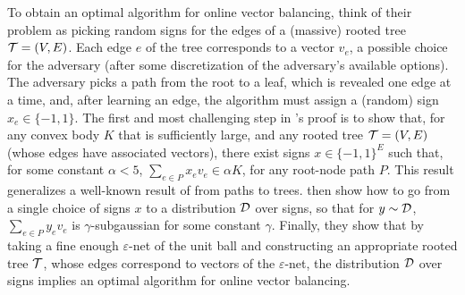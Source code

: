 

To obtain an optimal algorithm for online vector balancing, \citet{kulkarni2024optimal} think of their problem as picking random signs for the edges of a (massive) rooted tree $\mathcal{T} = (V,E)$. Each edge $e$ of the tree corresponds to a vector $v_e$, a possible choice for the adversary (after some discretization of the adversary's available options). The adversary picks a path from the root to a leaf, which is revealed one edge at a time, and, after learning an edge, the algorithm must assign a (random) sign $x_e \in \{-1,1 \}$. The first and most challenging step in \citeauthor{kulkarni2024optimal}'s proof is to show that, for any convex body $K$ that is sufficiently large, and any rooted tree $\mathcal{T} = (V,E)$ (whose edges have associated vectors), there exist signs $x \in \{-1,1 \}^E$ such that, for some constant $\alpha < 5$, $\sum_{e \in P} x_e v_e \in \alpha K$, for any root-node path $P$. This result generalizes a well-known result of \citet{banaszczyk2012series} from paths to trees. \citeauthor{kulkarni2024optimal} then show how to go from a single choice of signs $x$ to a distribution $\mathcal{D}$ over signs, so that for $y \sim \mathcal{D}$, $\sum_{e \in P} y_e v_e$ is $\gamma$-subgaussian for some constant $\gamma$. Finally, they show that by taking a fine enough $\varepsilon$-net of the unit ball and constructing an appropriate rooted tree $\mathcal{T}$, whose edges correspond to vectors of the $\varepsilon$-net, the distribution $\mathcal{D}$ over signs implies an optimal algorithm for online vector balancing.

